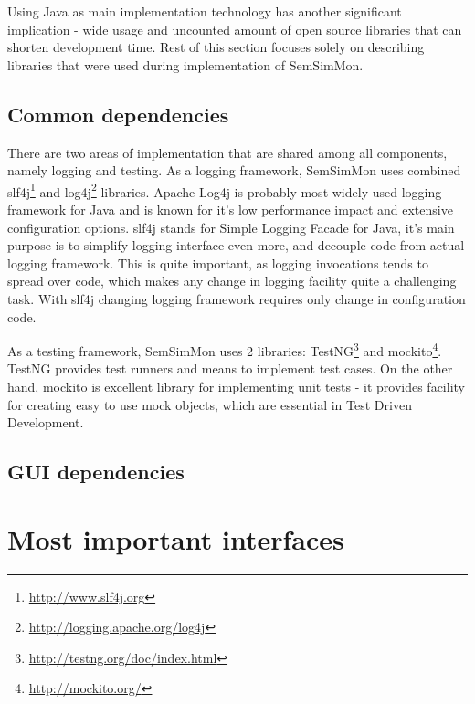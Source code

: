Using Java as main implementation technology has another significant implication - wide usage and uncounted amount of
open source libraries that can shorten development time. Rest of this section focuses solely on describing libraries
that were used during implementation of SemSimMon.



\subsection{Common dependencies}

There are two areas of implementation that are shared among all components, namely logging and testing. As a logging
framework, SemSimMon uses combined slf4j\footnote{\url{http://www.slf4j.org}} and
log4j\footnote{\url{http://logging.apache.org/log4j}} libraries. Apache Log4j is probably most widely used logging
framework for Java and is known for it's low performance impact and extensive configuration options. slf4j stands for
Simple Logging Facade for Java, it's main purpose is to simplify logging interface even more, and decouple code from
actual logging framework. This is quite important, as logging invocations tends to spread over code, which makes any
change in logging facility quite a challenging task. With slf4j changing logging framework requires only change in
configuration code.

As a testing framework, SemSimMon uses 2 libraries: TestNG\footnote{\url{http://testng.org/doc/index.html}} and
mockito\footnote{\url{http://mockito.org/}}. TestNG provides test runners and means to implement test cases. On the
other hand, mockito is excellent library for implementing unit tests - it provides facility for creating easy to use
mock objects, which are essential in Test Driven Development.

\subsection{GUI dependencies}




\section{Most important interfaces}


